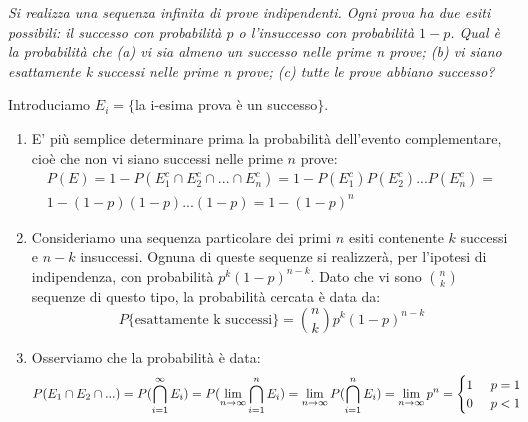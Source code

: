 \begin{Example}{}{}
    \textit{Si realizza una sequenza infinita di prove indipendenti. Ogni prova ha due esiti possibili: il successo con probabilità $p$ o  l'insuccesso con probabilità $1-p$. Qual è la probabilità che (a) vi sia almeno un successo nelle prime n prove; (b) vi siano esattamente k successi nelle prime n prove; (c) tutte le prove abbiano successo?}

    Introduciamo $E_i=\{$la i-esima prova è un successo$\}$.
    \begin{enumerate}[label=(\alph*)]
        \item E' più semplice determinare prima la probabilità dell'evento complementare, cioè che non vi siano successi nelle prime $n$ prove:
        \begin{align*}
            P(E)=1-P(E_1^c\cap E_2^c\cap...\cap E_n^c)=1-P(E_1^c)P(E_2^c)...P(E_n^c)=\\1-(1-p)(1-p)...(1-p)=1-(1-p)^n
        \end{align*}
        
        \item Consideriamo una sequenza particolare dei primi $n$ esiti contenente $k$ successi e $n-k$ insuccessi. Ognuna di queste sequenze si realizzerà, per l'ipotesi di indipendenza, con probabilità $p^k(1-p)^{n-k}$. Dato che vi sono $\binom{n}{k}$ sequenze di questo tipo, la probabilità cercata è data da:
        \begin{equation*}
            P\{\text{esattamente k successi}\}=\binom{n}{k}p^k(1-p)^{n-k}
        \end{equation*}

        \item Osserviamo che la probabilità è data:
        \begin{align*}
            P(E_1\cap E_2\cap...)=P(\bigcap^\infty_{i=1}E_i)=P(\lim_{n\to\infty}\bigcap^n_{i=1}E_i)=\lim_{n\to\infty}P(\bigcap^n_{i=1}E_i)=\lim_{n\to\infty}p^n=\begin{cases}1\hspace{0.5cm}p=1\\0\hspace{0.5cm}p<1\end{cases}
        \end{align*}
    \end{enumerate}
\end{Example}

